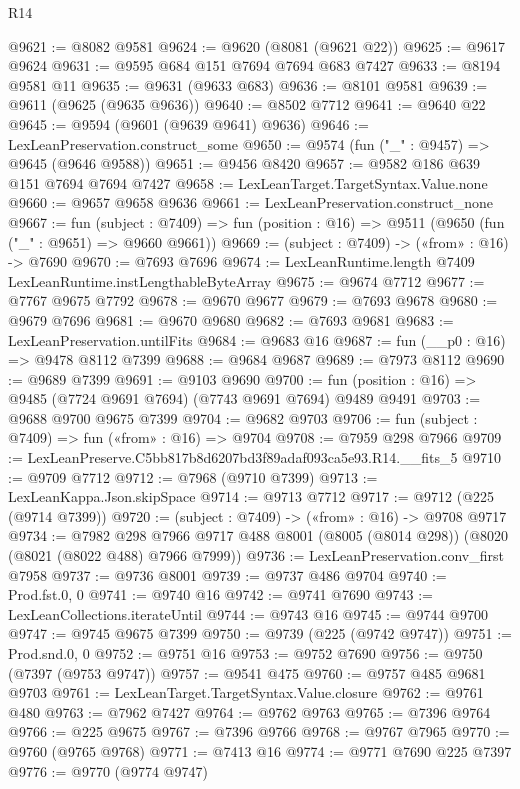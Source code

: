 \begin{lexlean}{R14}
\begin{coremodule}
@9621 := @8082 @9581
@9624 := @9620 (@8081 (@9621 @22))
@9625 := @9617 @9624
@9631 := @9595 @684 @151 @7694 @7694 @683 @7427
@9633 := @8194 @9581 @11
@9635 := @9631 (@9633 @683)
@9636 := @8101 @9581
@9639 := @9611 (@9625 (@9635 @9636))
@9640 := @8502 @7712
@9641 := @9640 @22
@9645 := @9594 (@9601 (@9639 @9641) @9636)
@9646 := LexLeanPreservation.construct_some
@9650 := @9574 (fun ("_" : @9457) => @9645 (@9646 @9588))
@9651 := @9456 @8420
@9657 := @9582 @186 @639 @151 @7694 @7694 @7427
@9658 := LexLeanTarget.TargetSyntax.Value.none
@9660 := @9657 @9658 @9636
@9661 := LexLeanPreservation.construct_none
@9667 := fun (subject : @7409) =>
  fun (position : @16) => @9511 (@9650 (fun ("_" : @9651) => @9660 @9661))
@9669 := (subject : @7409) -> («from» : @16) -> @7690
@9670 := @7693 @7696
@9674 := LexLeanRuntime.length @7409 LexLeanRuntime.instLengthableByteArray
@9675 := @9674 @7712
@9677 := @7767 @9675 @7792
@9678 := @9670 @9677
@9679 := @7693 @9678
@9680 := @9679 @7696
@9681 := @9670 @9680
@9682 := @7693 @9681
@9683 := LexLeanPreservation.untilFits
@9684 := @9683 @16
@9687 := fun (__p0 : @16) => @9478 @8112 @7399
@9688 := @9684 @9687
@9689 := @7973 @8112
@9690 := @9689 @7399
@9691 := @9103 @9690
@9700 := fun (position : @16) => @9485 (@7724 @9691 @7694) (@7743 @9691 @7694) @9489 @9491
@9703 := @9688 @9700 @9675 @7399
@9704 := @9682 @9703
@9706 := fun (subject : @7409) => fun («from» : @16) => @9704
@9708 := @7959 @298 @7966
@9709 := LexLeanPreserve.C5bb817b8d6207bd3f89adaf093ca5e93.R14.__fits_5
@9710 := @9709 @7712
@9712 := @7968 (@9710 @7399)
@9713 := LexLeanKappa.Json.skipSpace
@9714 := @9713 @7712
@9717 := @9712 (@225 (@9714 @7399))
@9720 := (subject : @7409) -> («from» : @16) -> @9708 @9717
@9734 := @7982
    @298
    @7966
    @9717
    @488
    @8001
    (@8005 (@8014 @298))
    (@8020 (@8021 (@8022 @488) @7966 @7999))
@9736 := LexLeanPreservation.conv_first @7958
@9737 := @9736 @8001
@9739 := @9737 @486 @9704
@9740 := Prod.fst.{0, 0}
@9741 := @9740 @16
@9742 := @9741 @7690
@9743 := LexLeanCollections.iterateUntil
@9744 := @9743 @16
@9745 := @9744 @9700
@9747 := @9745 @9675 @7399
@9750 := @9739 (@225 (@9742 @9747))
@9751 := Prod.snd.{0, 0}
@9752 := @9751 @16
@9753 := @9752 @7690
@9756 := @9750 (@7397 (@9753 @9747))
@9757 := @9541 @475
@9760 := @9757 @485 @9681 @9703
@9761 := LexLeanTarget.TargetSyntax.Value.closure
@9762 := @9761 @480
@9763 := @7962 @7427
@9764 := @9762 @9763
@9765 := @7396 @9764
@9766 := @225 @9675
@9767 := @7396 @9766
@9768 := @9767 @7965
@9770 := @9760 (@9765 @9768)
@9771 := @7413 @16
@9774 := @9771 @7690 @225 @7397
@9776 := @9770 (@9774 @9747)

\end{coremodule}
\end{lexlean}
